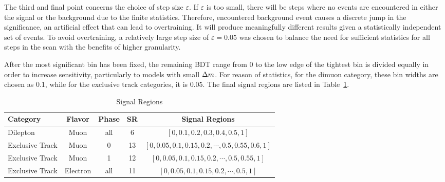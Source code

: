 The third and final point concerns the choice of step size $\varepsilon$. If $\varepsilon$ is too small, there will be steps where no events are encountered in either the signal or the background due to the finite statistics. Therefore, encountered background event causes a discrete jump in the significance, an artificial effect that can lead to overtraining. It will produce meaningfully different results given a statistically independent set of events. To avoid overtraining, a relatively large step size of $\varepsilon=0.05$ was chosen to balance the need for sufficient statistics for all steps in the scan with the benefits of higher granularity.

After the most significant bin has been fixed, the remaining BDT range from 0 to the low edge of the tightest bin is divided equally in order to increase sensitivity, particularly to models with small $\Delta m$. For reason of statistics, for the dimuon category, these bin widths are chosen as 0.1, while for the exclusive track categories, it is 0.05. The final signal regions are listed in Table~\ref{tab:signal-regions}.

\begin{table}[hp]
	\centering
	
		\caption{\label{tab:signal-regions}Signal Regions}
			\begin{tabular}{lcccc} \hline
			Category & Flavor & Phase & SR & Signal Regions \\ \hline
			Dilepton & Muon & all &  6 & $[0,0.1,0.2,0.3,0.4,0.5,1]$ \\
			
			Exclusive Track & Muon & 0 & 13 & $[0,0.05,0.1,0.15,0.2,\cdots,0.5,0.55,0.6,1]$ \\ 
			Exclusive Track & Muon & 1 & 12 & $[0,0.05,0.1,0.15,0.2,\cdots,0.5,0.55,1]$ \\	
			Exclusive Track & Electron & all & 11 & $[0,0.05,0.1,0.15,0.2,\cdots,0.5,1]$ \\			
			
			\hline
			\end{tabular}
\end{table}
